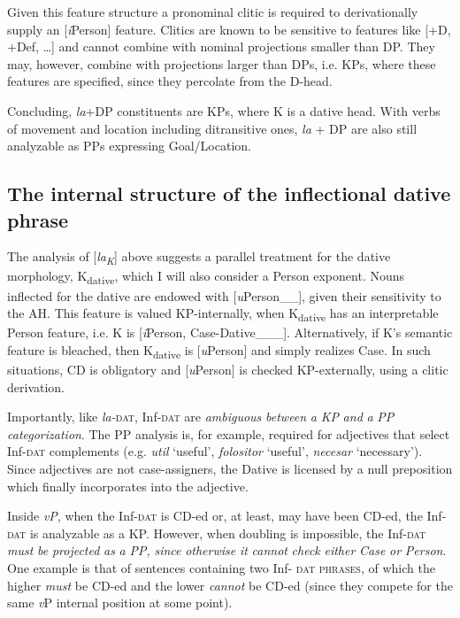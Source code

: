 \documentclass[output=paper,colorlinks,citecolor=brown,nonflat]{./langscibook}
\begin{document}
Given this feature structure a pronominal clitic is required to derivationally supply an [\textit{i}Person] feature. Clitics are known to be sensitive to features like [+D, +Def, …] and cannot combine with nominal projections smaller than DP. They may, however, combine with projections larger than DPs, i.e. KPs, where these features are specified, since they percolate from the D-head. 

Concluding, \textit{la}+DP constituents are KPs, where K is a dative head. With verbs of movement and location including ditransitive ones, \textit{la} + DP are also still analyzable as PPs expressing Goal/Location.

\subsection{{The} {internal} {structure} {of} {the} {inflectional} {dative} {phrase}}%
\label{sec:cornilescu:2.4}

The analysis of [\textit{la\textsubscript{K}}] above suggests a parallel treatment for the dative morphology, K\textsubscript{dative}, which I will also consider a Person exponent. Nouns inflected for the dative are endowed with [\textit{u}Person\_\_], given their sensitivity to the AH. This feature is valued KP-internally, when K\textsubscript{dative} has an interpretable Person feature, i.e. K is [\textit{i}Person, Case-Dative\_\_\_]. Alternatively, if K’s semantic feature is bleached, then K\textsubscript{dative} is [\textit{u}Person] and simply realizes Case. In such situations, CD is obligatory and [\textit{u}Person] is checked KP-externally, using a clitic derivation. 

Importantly, like \textit{la-}\textsc{dat}, Inf-\textsc{dat} are \textit{ambiguous} \textit{between} \textit{a} \textit{KP} \textit{and} \textit{a} \textit{PP} \textit{categorization}. The PP analysis is, for example, required for adjectives that select Inf-\textsc{dat} complements (e.g. \textit{util} ‘useful’, \textit{folositor} ‘useful’, \textit{necesar} ‘necessary’). Since adjectives are not case-assigners, the Dative is licensed by a null preposition which finally incorporates into the adjective.

Inside \textit{vP}, when the Inf-\textsc{dat} is CD-ed or, at least, may have been CD-ed, the Inf-\textsc{dat} is analyzable as a KP. However, when doubling is impossible, the Inf-\textsc{dat} \textit{must} \textit{be} \textit{projected} \textit{as} \textit{a} \textit{PP,} \textit{since} \textit{otherwise} \textit{it} \textit{cannot} \textit{check} \textit{either} \textit{Case} \textit{or} \textit{Person}. One example is that of sentences containing two Inf- \textsc{dat} \textsc{phrases}, of which the higher \textit{must} be CD-ed and the lower \textit{cannot} be CD-ed (since they compete for the same \textit{v}P internal position at some point).
\end{document}
